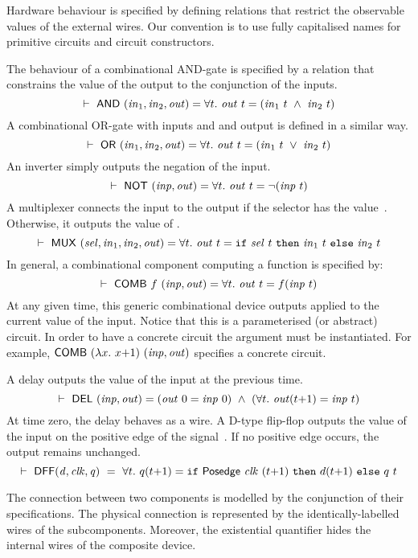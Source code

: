 \documentclass{llncs}
\begin{document}
Hardware behaviour is specified by defining
relations that restrict the observable values of the 
external wires. Our convention is to use fully 
capitalised names for primitive circuits and 
circuit constructors.

The behaviour of a combinational AND-gate
is specified by a relation that constrains the value of the output
to the conjunction of the inputs.
\[
\TURNST\ \DEF{AND}\ (\sVAR{in}{1},\sVAR{in}{2},\VAR{out}) = 
   \forall t.\ \VAR{out}\ t = (\sVAR{in}{1}\ t\ \AND\ \sVAR{in}{2}\ t)
\]
A combinational OR-gate with inputs  and 
and output  is defined in a similar way.
\[
\TURNST\ \DEF{OR}\ (\sVAR{in}{1},\sVAR{in}{2},\VAR{out}) = 
   \forall t.\ \VAR{out}\ t = (\sVAR{in}{1}\ t\ \OR\ \sVAR{in}{2}\ t)
\]
An inverter simply outputs the negation of the input.
\[
\vdash\ \mathsf{NOT}\ (\mathit{inp},\mathit{out}) = 
   \forall t.\ \mathit{out}\ t = \neg(\mathit{inp}\ t)
\]
A multiplexer connects the input 
to the output  if the selector  has the value~.
Otherwise, it outputs the value of .
\[
\TURNST\ \DEF{MUX}\ (\VAR{sel},\sVAR{in}{1},\sVAR{in}{2},\VAR{out}) = 
   \forall t.\ \VAR{out}\ t = \IF{\VAR{sel}\ t}{\sVAR{in}{1}\ t}{\sVAR{in}{2}\ t}
\]
In general, a combinational component computing a function 
is specified by:
\[
\vdash\ \mathsf{COMB}\ f\ \mathit{(inp,out)} = \forall t.\ \mathit{out}\ t = f (\mathit{inp}\ t)
\]
At any given time, this generic combinational device
outputs  applied to the current value
of the input. Notice that this is a parameterised
(or abstract) circuit. In order to have a concrete circuit
the argument  must be instantiated.
For example, $\DEF{COMB}\ (\lambda x.\ x{+}1)\ (\VAR{inp,out})$
specifies a concrete circuit.

A delay outputs the value of the input at the previous time.
\[
\TURNST\ \DEF{DEL}\ (\VAR{inp},\VAR{out}) = 
    (\VAR{out}\ 0 = \VAR{inp}\ 0)\ \AND\ 
    (\forall t.\ \VAR{out} (t{+}1) = \VAR{inp}\ t)
\]
At time zero, the delay behaves as a wire.
A D-type flip-flop  outputs the value of the input  on the
positive edge of the signal~\VAR{clk}.
If no positive edge occurs, the output  remains
unchanged.
\[
\vdash\ \mathsf{DFF} (\mathit{d,clk,q})~ =~
 \forall t.\ q (t{+}1) =  \texttt{if}~\mathsf{Posedge}\ \mathit{clk}\ (t{+}1)~\texttt{then}~d (t{+}1)~\texttt{else}~q\ t
\]

The connection between two components is modelled
by the conjunction of their specifications.
The physical connection is represented by
the identically-labelled wires of the subcomponents.
Moreover,  the existential quantifier hides the 
internal wires of the composite device.
\end{document}
